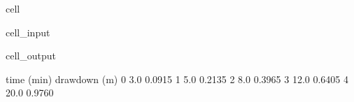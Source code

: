 \documentclass[letterpaper,10pt,english]{jupyterBook}
\begin{document}
\begin{sphinxuseclass}{cell}\begin{sphinxVerbatimInput}

\begin{sphinxuseclass}{cell_input}
\begin{sphinxVerbatim}[commandchars=\\\{\}]
       \PYG{p}{[} \PYG{p}{]}

 \PYG{p}{[}\PYG{p}{]}
 \PYG{p}{[}\PYG{p}{]}

     
    
\end{sphinxVerbatim}

\end{sphinxuseclass}\end{sphinxVerbatimInput}
\begin{sphinxVerbatimOutput}

\begin{sphinxuseclass}{cell_output}
\begin{sphinxVerbatim}[commandchars=\\\{\}]
   time (min)  drawdown (m)
0         3.0        0.0915
1         5.0        0.2135
2         8.0        0.3965
3        12.0        0.6405
4        20.0        0.9760
\end{sphinxVerbatim}

\end{sphinxuseclass}\end{sphinxVerbatimOutput}

\end{sphinxuseclass}
\end{document}
